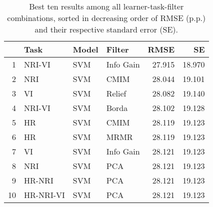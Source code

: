 \begin{table}[ht!]
\centering
\caption{Best ten results among all learner-task-filter combinations, sorted in decreasing order of RMSE (p.p.) and their respective standard error (SE).} 
\label{tab:perf-top-10}
\begin{tabular}{rlllrr}
  \hline
 & Task & Model & Filter & RMSE & SE \\ 
  \hline
1 & NRI-VI & SVM & Info Gain & 27.915 & 18.970 \\ 
  2 & NRI & SVM & CMIM & 28.044 & 19.101 \\ 
  3 & VI & SVM & Relief & 28.082 & 19.140 \\ 
  4 & NRI-VI & SVM & Borda & 28.102 & 19.128 \\ 
  5 & HR & SVM & CMIM & 28.119 & 19.123 \\ 
  6 & HR & SVM & MRMR & 28.119 & 19.123 \\ 
  7 & VI & SVM & Info Gain & 28.121 & 19.123 \\ 
  8 & NRI & SVM & PCA & 28.121 & 19.123 \\ 
  9 & HR-NRI & SVM & PCA & 28.121 & 19.123 \\ 
  10 & HR-NRI-VI & SVM & PCA & 28.121 & 19.123 \\ 
   \hline
\end{tabular}
\end{table}
